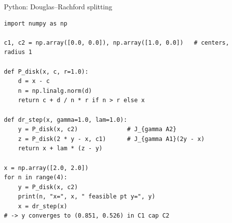 \documentclass[aspectratio=169,10pt]{beamer}
\begin{document}
\begin{frame}[fragile]{Python: Douglas--Rachford splitting}
\begin{lstlisting}
import numpy as np

c1, c2 = np.array([0.0, 0.0]), np.array([1.0, 0.0])   # centers, radius 1

def P_disk(x, c, r=1.0):
    d = x - c
    n = np.linalg.norm(d)
    return c + d / n * r if n > r else x

def dr_step(x, gamma=1.0, lam=1.0):
    y = P_disk(x, c2)              # J_{gamma A2}
    z = P_disk(2 * y - x, c1)      # J_{gamma A1}(2y - x)
    return x + lam * (z - y)

x = np.array([2.0, 2.0])
for n in range(4):
    y = P_disk(x, c2)
    print(n, "x=", x, " feasible pt y=", y)
    x = dr_step(x)
# -> y converges to (0.851, 0.526) in C1 cap C2
\end{lstlisting}
\end{frame}
\end{document}
